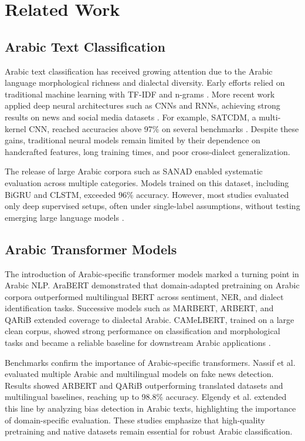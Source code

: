 \documentclass[sn-mathphys-num]{sn-jnl}
\begin{document}
\section{Related Work}
\label{rel-works}

\subsection{Arabic Text Classification}
Arabic text classification has received growing attention due to the Arabic language morphological richness and dialectal diversity. Early efforts relied on traditional machine learning with TF-IDF and n-grams \cite{omar2021multi}. More recent work applied deep neural architectures such as CNNs and RNNs, achieving strong results on news and social media datasets \cite{muaad2022effective,almuzaini2020impact}. For example, SATCDM, a multi-kernel CNN, reached accuracies above 97\% on several benchmarks \cite{alhawarat2020superior}. Despite these gains, traditional neural models remain limited by their dependence on handcrafted features, long training times, and poor cross-dialect generalization.

The release of large Arabic corpora such as SANAD \cite{elnagar2020arabic} enabled systematic evaluation across multiple categories. Models trained on this dataset, including BiGRU and CLSTM, exceeded 96\% accuracy. However, most studies evaluated only deep supervised setups, often under single-label assumptions, without testing emerging large language models \cite{rifai2021arabic,el2022arabic}.

\subsection{Arabic Transformer Models}
The introduction of Arabic-specific transformer models marked a turning point in Arabic NLP. AraBERT \cite{helwe2020semi} demonstrated that domain-adapted pretraining on Arabic corpora outperformed multilingual BERT across sentiment, NER, and dialect identification tasks. Successive models such as MARBERT, ARBERT, and QARiB extended coverage to dialectal Arabic. CAMeLBERT, trained on a large clean corpus, showed strong performance on classification and morphological tasks and became a reliable baseline for downstream Arabic applications \cite{yagi2021evaluation,elnagar2023benchmark,nassif2022arabic}.

Benchmarks confirm the importance of Arabic-specific transformers. Nassif et al. \cite{nassif2022arabic} evaluated multiple Arabic and multilingual models on fake news detection. Results showed ARBERT and QARiB outperforming translated datasets and multilingual baselines, reaching up to 98.8\% accuracy. Elgendy et al. \cite{elgendy2024toxicity} extended this line by analyzing bias detection in Arabic texts, highlighting the importance of domain-specific evaluation. These studies emphasize that high-quality pretraining and native datasets remain essential for robust Arabic classification.
\end{document}
